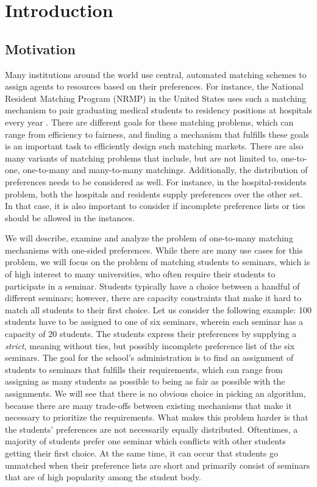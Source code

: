 \section{Introduction}
\label{sec:introduction}

\subsection{Motivation}
Many institutions around the world use central, automated matching schemes to assign agents to resources based on their preferences. For instance, the National Resident Matching Program (NRMP) in the United States uses such a matching mechanism to pair graduating medical students to residency positions at hospitals every year \cite{Roth-NRMP}. There are different goals for these matching problems, which can range from efficiency to fairness, and finding a mechanism that fulfills these goals is an important task to efficiently design such matching markets.
There are also many variants of matching problems that include, but are not limited to, one-to-one, one-to-many and many-to-many matchings. Additionally, the distribution of preferences needs to be considered as well. For instance, in the hospital-residents problem, both the hospitals and residents supply preferences over the other set. In that case, it is also important to consider if incomplete preference lists or ties should be allowed in the instances. 

We will describe, examine and analyze the problem of one-to-many matching mechanisms with one-sided preferences. While there are many use cases for this problem, we will focus on the problem of matching students to seminars, which is of high interest to many universities, who often require their students to participate in a seminar. Students typically have a choice between a handful of different seminars; however, there are capacity constraints that make it hard to match all students to their first choice. Let us consider the following example: 100 students have to be assigned to one of six seminars, wherein each seminar has a capacity of 20 students. The students express their preferences by supplying a \emph{strict}, meaning without ties, but possibly incomplete preference list of the six seminars. The goal for the school's administration is to find an assignment of students to seminars that fulfills their requirements, which can range from assigning as many students as possible to being as fair as possible with the assignments. We will see that there is no obvious choice in picking an algorithm, because there are many trade-offs between existing mechanisms that make it necessary to prioritize the requirements.  
What makes this problem harder is that the students' preferences are not necessarily equally distributed. Oftentimes, a majority of students prefer one seminar which conflicts with other students getting their first choice. At the same time, it can occur that students go unmatched when their preference lists are short and primarily consist of seminars that are of high popularity among the student body.

